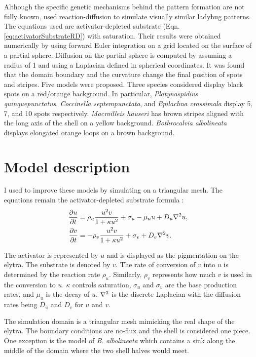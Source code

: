 Although the specific genetic mechanisms behind the pattern formation are not fully known, \citet{liaw2001} used reaction-diffusion to simulate visually similar ladybug patterns. The equations used are activator-depleted substrate (Eqn. \ref{eq:activatorSubstrateRD}) with saturation. Their results were obtained numerically by using forward Euler integration on a grid located on the surface of a partial sphere. Diffusion on the partial sphere is computed by assuming a radius of 1 and using a Laplacian defined in spherical coordinates. It was found that the domain boundary and the curvature change the final position of spots and stripes. Five models were proposed. Three species considered display black spots on a red/orange background. In particular, \textit{Platynaspidius quinquepunctatus}, \textit{Coccinella septempunctata}, and \textit{Epilachna crassimala} display 5, 7, and 10 spots respectively. \textit{Macroilleis hauseri} has brown stripes aligned with the long axis of the shell on a yellow background. \textit{Bothrocalvia albolineata} displays elongated orange loops on a brown background.

\section{Model description} 
I used \ProgramName{} to improve these models by simulating on a triangular mesh. The equations remain the activator-depleted substrate formula \citep{meinhardt1982}:
\begin{equation}
	\begin{aligned} \label{eq:ladybugRD}
   \frac{\partial u}{\partial t} &= \rho_u \frac{u^2v}{1+\kappa u^2} + \sigma_u - \mu_u u + D_u \nabla^2 u, \\
   \frac{\partial v}{\partial t} &= -\rho_v \frac{u^2v}{1+\kappa u^2} + \sigma_v + D_v \nabla^2 v.
	\end{aligned}
\end{equation}

The activator is represented by $u$ and is displayed as the pigmentation on the elytra. The substrate is denoted by $v$. The rate of conversion of $v$ into $u$ is determined by the reaction rate $\rho_u$. Similarly, $\rho_v$ represents how much $v$ is used in the conversion to $u$. $\kappa$ controls saturation, $\sigma_u$ and $\sigma_v$ are the base production rates, and $\mu_u$ is the decay of $u$. $\nabla^2$ is the discrete Laplacian with the diffusion rates being $D_u$ and $D_v$ for $u$ and $v$.

The simulation domain is a triangular mesh mimicking the real shape of the elytra. The boundary conditions are no-flux and the shell is considered one piece. One exception is the model of  \textit{B. albolineata} which contains a sink along the middle of the domain where the two shell halves would meet. 


